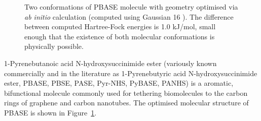 \documentclass[
  a4paper,
]{scrbook}
\begin{document}
\begin{figure}
\begin{minipage}[t]{0.47\linewidth}
{\centering 


}

\end{minipage}%

\caption{\label{fig-pbase-structure}Two conformations of PBASE molecule
with geometry optimised via \emph{ab initio} calculation (computed using
Gaussian 16 \autocite{g16}). The difference between computed
Hartree-Fock energies is 1.0 kJ/mol, small enough that the existence of
both molecular conformations is physically possible.}

\end{figure}

1-Pyrenebutanoic acid N-hydroxysuccinimide ester (variously known
commercially and in the literature as 1-Pyrenebutyric acid
N-hydroxysuccinimide ester, PBASE, PBSE, PASE, Pyr-NHS, PyBASE, PANHS)
is a aromatic, bifunctional molecule commonly used for tethering
biomolecules to the carbon rings of graphene and carbon nanotubes. The
optimised molecular structure of PBASE is shown in
Figure~\ref{fig-pbase-structure}.
\end{document}
